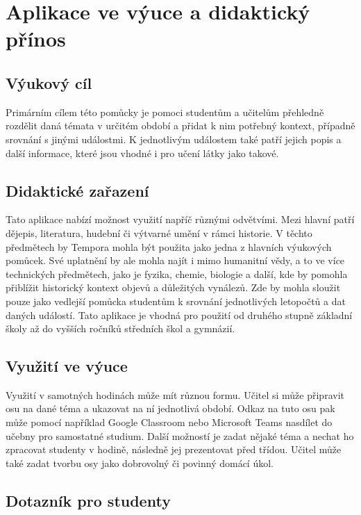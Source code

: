 \section{Aplikace ve výuce a didaktický přínos}

\subsection{Výukový cíl}
Primárním cílem této pomůcky je pomoci studentům a učitelům přehledně rozdělit daná témata v určitém období a přidat k nim potřebný kontext, případně srovnání s jinými událostmi. K jednotlivým událostem také patří jejich popis a další informace, které jsou vhodné i pro učení látky jako takové.

\subsection{Didaktické zařazení}
Tato aplikace nabízí možnost využití napříč různými odvětvími. Mezi hlavní patří dějepis, literatura, hudební či výtvarné umění v rámci historie. V těchto předmětech by Tempora mohla být použita jako jedna z hlavních výukových pomůcek. Své uplatnění by ale mohla najít i mimo humanitní vědy, a to ve více technických předmětech, jako je fyzika, chemie, biologie a další, kde by pomohla přiblížit historický kontext objevů a důležitých vynálezů. Zde by mohla sloužit pouze jako vedlejší pomůcka studentům k srovnání jednotlivých letopočtů a dat daných událostí. Tato aplikace je vhodná pro použití od druhého stupně základní školy až do vyšších ročníků středních škol a gymnázií.



\subsection{Využití ve výuce}
Využití v samotných hodinách může mít různou formu. Učitel si může připravit osu na dané téma a ukazovat na ní jednotlivá období. Odkaz na tuto osu pak může pomocí například Google Classroom nebo Microsoft Teams nasdílet do učebny pro samostatné studium. Další možností je zadat nějaké téma a nechat ho zpracovat studenty v hodině, následně jej prezentovat před třídou. Učitel může také zadat tvorbu osy jako dobrovolný či povinný domácí úkol.



\subsection{Dotazník pro studenty}
\label{Dotazník}

